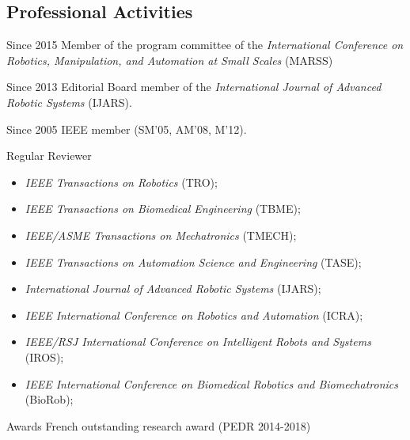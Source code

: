 \subsection{Professional Activities}
\noindent
\begin{CV}
  \item[Since 2015]  Member of the program committee of the \emph{International Conference on Robotics, Manipulation, and Automation at Small Scales} (MARSS)
  \item[Since 2013] Editorial Board member of the \emph{International Journal of Advanced Robotic Systems} (IJARS).
  \item[Since 2005] IEEE member (SM'05, AM'08, M'12).
  \item[Regular Reviewer] 
  \begin{itemize}
    \item \emph{IEEE Transactions on Robotics} (TRO);
    \item \emph{IEEE Transactions on Biomedical Engineering} (TBME);
    \item \emph{{IEEE/ASME} Transactions on Mechatronics} (TMECH);
    \item \emph{{IEEE} Transactions on Automation Science and Engineering} (TASE);
    \item \emph{International Journal of Advanced Robotic Systems} (IJARS);
    \item \emph{{IEEE} International Conference on Robotics and Automation} (ICRA);
    \item \emph{{IEEE/RSJ} International Conference on Intelligent Robots and Systems} (IROS);
    \item \emph{IEEE International Conference on Biomedical Robotics and Biomechatronics} (BioRob);
  \end{itemize}

  \item[Awards] French outstanding research award (PEDR 2014-2018)
\end{CV}

